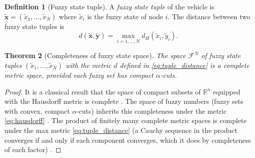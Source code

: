 \documentclass[twocolumn,10pt,a4paper]{article}
\newtheorem{theorem}{Theorem}[section]
\theoremstyle{definition}
\newtheorem{definition}[theorem]{Definition}
\theoremstyle{remark}
\newcommand{\R}{\mathbb{R}}
\newcommand{\Fcal}{\mathcal{F}}
\newcommand{\vect}[1]{\boldsymbol{#1}}
\newcommand{\fuzzy}[1]{\widetilde{#1}}
\begin{document}
\begin{definition}[Fuzzy state tuple]\label{def:fuzzy_tuple}
A \emph{fuzzy state tuple} of the vehicle is $\fuzzy{\vect{x}} = (\fuzzy{x}_1, \ldots, \fuzzy{x}_N)$ where $\fuzzy{x}_i$ is the fuzzy state of node $i$. The distance between two fuzzy state tuples is
\begin{equation}\label{eq:tuple_distance}
d(\fuzzy{\vect{x}}, \fuzzy{\vect{y}}) = \max_{i=1,\ldots,N} d_H(\fuzzy{x}_i, \fuzzy{y}_i).
\end{equation}
\end{definition}

\begin{theorem}[Completeness of fuzzy state space]\label{thm:complete_fuzzy}
The space $\Fcal^N$ of fuzzy state tuples $(\fuzzy{x}_1, \ldots, \fuzzy{x}_N)$ with the metric $d$ defined in \eqref{eq:tuple_distance} is a complete metric space, provided each fuzzy set has compact $\alpha$-cuts.
\end{theorem}

\begin{proof}
It is a classical result that the space of compact subsets of $\R^n$ equipped with the Hausdorff metric is complete \citep{Hausdorff1914, Diamond1994}. The space of fuzzy numbers (fuzzy sets with convex, compact $\alpha$-cuts) inherits this completeness under the metric \eqref{eq:hausdorff} \citep{Diamond1994}. The product of finitely many complete metric spaces is complete under the max metric \eqref{eq:tuple_distance} (a Cauchy sequence in the product converges if and only if each component converges, which it does by completeness of each factor) \citep{Rudin1991}.
\end{proof}
\end{document}

